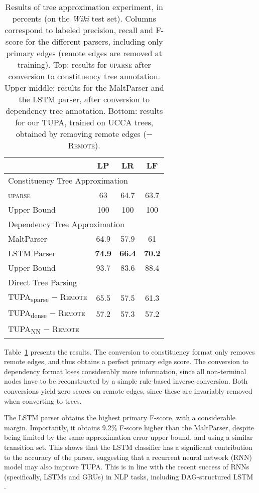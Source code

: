 \documentclass[11pt]{article}
\newcommand{\parser}[1]{TUPA\textsubscript{#1}}
\newcommand{\tabref}[1]{Table~\ref{#1}}
\begin{document}
\begin{table}[ht]
\centering
\begin{tabular}{l|ccc}
& \textbf{LP} & \textbf{LR} & \textbf{LF} \\
\hline
\multicolumn{4}{l}{\rule{0pt}{2ex} \footnotesize Constituency Tree Approximation} \\
\textsc{uparse} & 63 & 64.7 & 63.7 \\
Upper Bound & 100 & 100 & 100 \\
\hline
\multicolumn{4}{l}{\rule{0pt}{2ex} \footnotesize Dependency Tree Approximation} \\
MaltParser & 64.9 & 57.9 & 61 \\
LSTM Parser & {\bf 74.9} & {\bf 66.4} & {\bf 70.2} \\
Upper Bound & 93.7 & 83.6 & 88.4 \\
\hline
\multicolumn{4}{l}{\rule{0pt}{2ex} \footnotesize Direct Tree Parsing} \\
\parser{sparse} $-$ \textsc{Remote} & 65.5 & 57.5 & 61.3 \\
\parser{dense} $-$ \textsc{Remote} & 57.2 & 57.3 & 57.2 \\
\parser{NN} $-$ \textsc{Remote} &  \\
\end{tabular}
\caption{\label{fig:tree_approx_results}
  Results of tree approximation experiment, in percents (on the \textit{Wiki} test set).
  Columns correspond to labeled precision,
  recall and F-score for the different parsers, including only primary edges
  (remote edges are removed at training).
  Top: results for \textsc{uparse}
  after conversion to constituency tree annotation. Upper middle: results for the
  MaltParser and the LSTM parser, after conversion to dependency tree annotation.
  Bottom: results for our \parser{}, trained on
  UCCA trees, obtained by removing remote edges ($-$\textsc{Remote}).
}
\end{table}

\tabref{fig:tree_approx_results} presents the results.
The conversion to constituency format only removes remote edges,
and thus obtains a perfect primary edge score.
The conversion to dependency format loses considerably more information, since
all non-terminal nodes have to be reconstructed by a simple rule-based inverse
conversion. Both conversions yield zero scores on remote edges,
since these are invariably removed when converting to trees.

The LSTM parser obtains the highest primary F-score,
with a considerable margin. Importantly, it obtains 9.2\% F-score
higher than the MaltParser,
despite being limited by the same approximation error upper bound,
and using a similar transition set.
This shows that the LSTM classifier has a significant contribution
to the accuracy of
the parser, suggesting that a recurrent neural network (RNN) model
may also improve \parser{}.
This is in line with the recent success of RNNs
(specifically, LSTMs and GRUs) in NLP tasks, including DAG-structured LSTM
\cite{zhu-sobhani-guo:2016:N16-1}.
\end{document}
